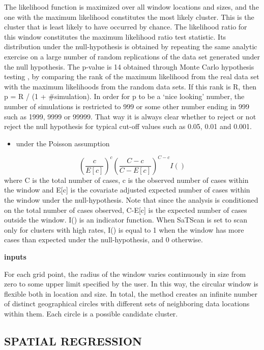 \documentclass[
]{article}
\providecommand{\tightlist}{%
  \setlength{\itemsep}{0pt}\setlength{\parskip}{0pt}}
\begin{document}
The likelihood function is maximized over all window locations and
sizes, and the one with the maximum likelihood constitutes the most
likely cluster. This is the cluster that is least likely to have
occurred by chance. The likelihood ratio for this window constitutes the
maximum likelihood ratio test statistic. Its distribution under the
null-hypothesis is obtained by repeating the same analytic exercise on a
large number of random replications of the data set generated under the
null hypothesis. The p-value is 14 obtained through Monte Carlo
hypothesis testing , by comparing the rank of the maximum likelihood
from the real data set with the maximum likelihoods from the random data
sets. If this rank is R, then p = R / (1 + \#simulation). In order for p
to be a `nice looking' number, the number of simulations is restricted
to 999 or some other number ending in 999 such as 1999, 9999 or 99999.
That way it is always clear whether to reject or not reject the null
hypothesis for typical cut-off values such as 0.05, 0.01 and 0.001.

\begin{itemize}
\tightlist
\item
  under the Poisson assumption
\end{itemize}

\[(\frac{c}{E[c]})^c(\frac{C-c}{C-E[c]})^{C-c}I()\] where C is the total
number of cases, c is the observed number of cases within the window and
E{[}c{]} is the covariate adjusted expected number of cases within the
window under the null-hypothesis. Note that since the analysis is
conditioned on the total number of cases observed, C-E{[}c{]} is the
expected number of cases outside the window. I() is an indicator
function. When SaTScan is set to scan only for clusters with high rates,
I() is equal to 1 when the window has more cases than expected under the
null-hypothesis, and 0 otherwise.

\textbf{inputs}

For each grid point, the radius of the window varies continuously in
size from zero to some upper limit specified by the user. In this way,
the circular window is flexible both in location and size. In total, the
method creates an infinite number of distinct geographical circles with
different sets of neighboring data locations within them. Each circle is
a possible candidate cluster.

\hypertarget{spatial-regression}{%
\subsection{SPATIAL REGRESSION}\label{spatial-regression}}
\end{document}
